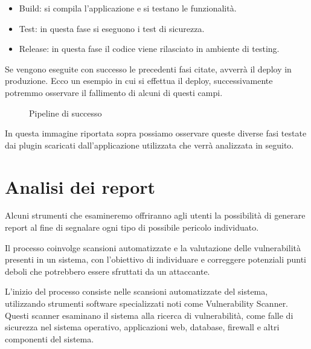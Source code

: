 \begin{itemize}
    \item Build: si compila l’applicazione e si testano le funzionalità.
    \item Test: in questa fase si eseguono i test di sicurezza. 
    \item   Release: in questa fase il codice viene rilasciato in ambiente di testing.
\end{itemize}
Se vengono eseguite con successo le precedenti fasi citate,  avverrà il deploy in produzione.
Ecco un esempio in cui si effettua il deploy, successivamente potremmo osservare il fallimento di alcuni di questi campi.
\begin{figure}[H]
    \caption{Pipeline di successo}
    \label{fig:pipelineSuc}
\end{figure}
In questa immagine riportata sopra possiamo osservare queste diverse fasi testate dai plugin scaricati dall’applicazione utilizzata che verrà analizzata in seguito.
\section{Analisi dei report}
Alcuni strumenti che esamineremo offriranno agli utenti la possibilità di generare report al fine di segnalare ogni tipo di possibile pericolo individuato.

Il processo coinvolge scansioni automatizzate e la valutazione delle vulnerabilità presenti in un sistema, con l'obiettivo di individuare e correggere potenziali punti deboli che potrebbero essere sfruttati da un attaccante.

L'inizio del processo consiste nelle scansioni automatizzate del sistema, utilizzando strumenti software specializzati noti come Vulnerability Scanner. Questi scanner esaminano il sistema alla ricerca di vulnerabilità, come falle di sicurezza nel sistema operativo, applicazioni web, database, firewall e altri componenti del sistema.

